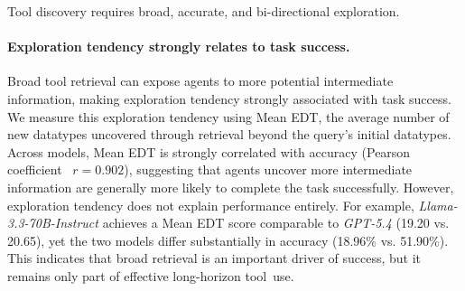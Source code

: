 \documentclass{llmxive}
\begin{document}
\begin{takeaway}
Tool discovery requires broad, accurate, and bi-directional exploration.
\end{takeaway}


\paragraph{Exploration tendency strongly relates to task success.}
Broad tool retrieval can expose agents to more potential intermediate information, making exploration tendency strongly associated with task success.
We measure this exploration tendency using Mean EDT, the average number of new datatypes uncovered through retrieval beyond the query's initial datatypes. 
Across models, Mean EDT is strongly correlated with accuracy (Pearson coefficient~\citep{Pearson} $r=0.902$), suggesting that agents uncover more intermediate information are generally more likely to complete the task successfully. 
However, exploration tendency does not explain performance entirely. 
For example, \textit{Llama-3.3-70B-Instruct} achieves a Mean EDT score comparable to \textit{GPT-5.4} (19.20 vs. 20.65), yet the two models differ substantially in accuracy (18.96\% vs. 51.90\%).
This indicates that broad retrieval is an important driver of success, but it remains only part of effective long-horizon tool~use. 

\end{document}
